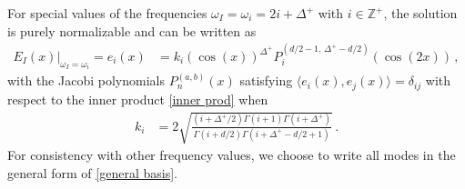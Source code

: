 \documentclass[letterpaper,11pt]{article}
\newcommand{\oi}{\omega_i}
\begin{document}
For special values of the frequencies $\omega_I = \omega_i = 2i + \Delta^+$ with $i \in \mathbb{Z}^+$, the solution is purely normalizable 
and can be written as
\begin{align}
\label{normal basis}
E_I (x)\Big|_{\omega_I = \oi} = e_i(x) &= k_i \left( \cos(x) \right)^{\Delta^+} P_{i}^{(d/2 - 1, \, \Delta^+ - d/2)} \left( \cos (2x) \right) \, ,
\end{align}
with the Jacobi polynomials $P^{(a,b)}_n (x)$ satisfying ${\langle e_i (x), e_j(x) \rangle = \delta_{i j}}$ with respect to the inner product \eqref{inner prod} when
\begin{align}
k_i &= 2 \sqrt{\frac{(i + \Delta^+ /2) \Gamma(i+1) \Gamma(i+\Delta^+)}{\Gamma(i+d/2) \Gamma(i + \Delta^+ - d/2 + 1)}} \, .
\end{align}
For consistency with other frequency values, we choose to write all modes in the general form of \eqref{general basis}. 
\end{document}
